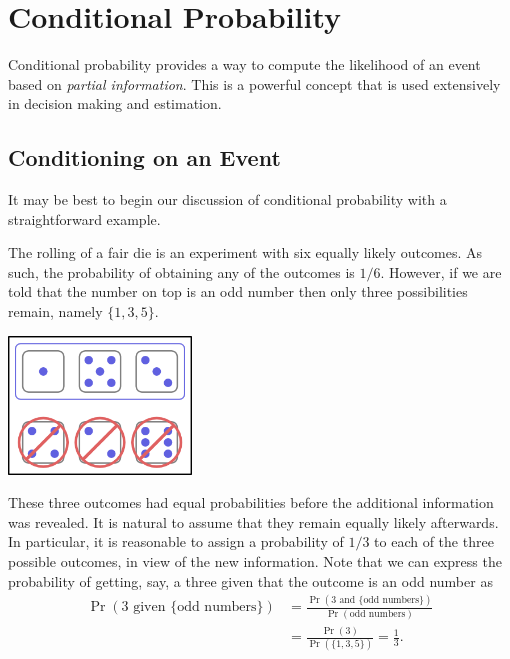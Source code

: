 \chapter{Conditional Probability}
\label{chapter:ConditionalProbability}

Conditional probability provides a way to compute the likelihood of an event based on \emph{partial information}.
This is a powerful concept that is used extensively in decision making and estimation.


\section{Conditioning on an Event}

It may be best to begin our discussion of conditional probability with a straightforward example.

\begin{example}
The rolling of a fair die is an experiment with six equally likely outcomes.
As such, the probability of obtaining any of the outcomes is $1/6$.
However, if we are told that the number on top is an odd number then only three possibilities remain, namely $\{1, 3, 5 \}$.

\begin{center}
\includegraphics[height=3.675cm]{Figures/3Chapter/condevent}
\end{center}

These three outcomes had equal probabilities before the additional information was revealed.
It is natural to assume that they remain equally likely afterwards.
In particular, it is reasonable to assign a probability of $1/3$ to each of the three possible outcomes, in view of the new information.
Note that we can express the probability of getting, say, a three given that the outcome is an odd number as
\begin{equation*}
\begin{split}
\Pr (\text{3 given } \{ \text{odd numbers} \})
&= \frac{\Pr (\text{3 and } \{ \text{odd numbers} \})}
{\Pr (\text{odd numbers})} \\
&= \frac{\Pr(3)}{\Pr (\{1,3,5\})} = \frac{1}{3} .
\end{split}
\end{equation*}
\end{example}


